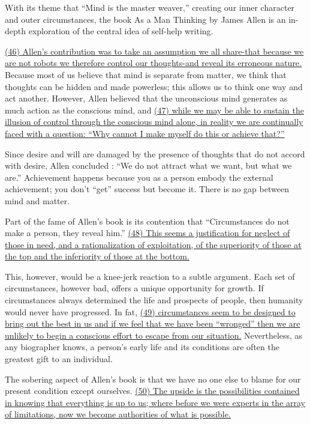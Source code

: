 With its theme that ``Mind is the master weaver,'' creating our inner character and outer circumstances, the book As a Man Thinking by James Allen is an in-depth exploration of the central idea of self-help writing.

\ul{(46) Allen's contribution was to take an assumption we all share-that because we are not robots we therefore control our thoughts-and reveal its erroneous nature.} Because most of us believe that mind is separate from matter, we think that thoughts can be hidden and made powerless; this allows us to think one way and act another. However, Allen believed that the unconscious mind generates as much action as the conscious mind, and \ul{(47) while we may be able to sustain the illusion of control through the conscious mind alone, in reality we are continually faced with a question: ``Why cannot I make myself do this or achieve that?''}

Since desire and will are damaged by the presence of thoughts that do not accord with desire, Allen concluded : ``We do not attract what we want, but what we are.'' Achievement happens because you as a person embody the external achievement; you don't ``get'' success but become it. There is no gap between mind and matter.

Part of the fame of Allen’s book is its contention that ``Circumstances do not make a person, they reveal him.'' \ul{(48) This seems a justification for neglect of those in need, and a rationalization of exploitation, of the superiority of those at the top and the inferiority of those at the bottom.}

This, however, would be a knee-jerk reaction to a subtle argument. Each set of circumstances, however bad, offers a unique opportunity for growth. If circumstances always determined the life and prospects of people, then humanity would never have progressed. In fat, \ul{(49) circumstances seem to be designed to bring out the best in us and if we feel that we have been ``wronged'' then we are unlikely to begin a conscious effort to escape from our situation.} Nevertheless, as any biographer knows, a person's early life and its conditions are often the greatest gift to an individual.

The sobering aspect of Allen's book is that we have no one else to blame for our present condition except ourselves. \ul{(50) The upside is the possibilities contained in knowing that everything is up to us; where before we were experts in the array of limitations, now we become authorities of what is possible.}
